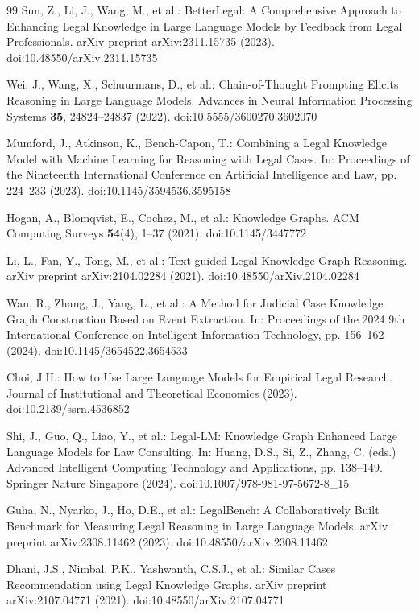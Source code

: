 \documentclass{article}
\theoremstyle{plain}
\theoremstyle{definition}
\begin{document}
\begin{thebibliography}{99}
Sun, Z., Li, J., Wang, M., et al.: BetterLegal: A Comprehensive Approach to Enhancing Legal Knowledge in Large Language Models by Feedback from Legal Professionals. arXiv preprint arXiv:2311.15735 (2023). doi:10.48550/arXiv.2311.15735

Wei, J., Wang, X., Schuurmans, D., et al.: Chain-of-Thought Prompting Elicits Reasoning in Large Language Models. Advances in Neural Information Processing Systems \textbf{35}, 24824--24837 (2022). doi:10.5555/3600270.3602070

Mumford, J., Atkinson, K., Bench-Capon, T.: Combining a Legal Knowledge Model with Machine Learning for Reasoning with Legal Cases. In: Proceedings of the Nineteenth International Conference on Artificial Intelligence and Law, pp. 224--233 (2023). doi:10.1145/3594536.3595158

Hogan, A., Blomqvist, E., Cochez, M., et al.: Knowledge Graphs. ACM Computing Surveys \textbf{54}(4), 1--37 (2021). doi:10.1145/3447772

Li, L., Fan, Y., Tong, M., et al.: Text-guided Legal Knowledge Graph Reasoning. arXiv preprint arXiv:2104.02284 (2021). doi:10.48550/arXiv.2104.02284

Wan, R., Zhang, J., Yang, L., et al.: A Method for Judicial Case Knowledge Graph Construction Based on Event Extraction. In: Proceedings of the 2024 9th International Conference on Intelligent Information Technology, pp. 156--162 (2024). doi:10.1145/3654522.3654533

Choi, J.H.: How to Use Large Language Models for Empirical Legal Research. Journal of Institutional and Theoretical Economics (2023). doi:10.2139/ssrn.4536852

Shi, J., Guo, Q., Liao, Y., et al.: Legal-LM: Knowledge Graph Enhanced Large Language Models for Law Consulting. In: Huang, D.S., Si, Z., Zhang, C. (eds.) Advanced Intelligent Computing Technology and Applications, pp. 138--149. Springer Nature Singapore (2024). doi:10.1007/978-981-97-5672-8\_15

Guha, N., Nyarko, J., Ho, D.E., et al.: LegalBench: A Collaboratively Built Benchmark for Measuring Legal Reasoning in Large Language Models. arXiv preprint arXiv:2308.11462 (2023). doi:10.48550/arXiv.2308.11462

Dhani, J.S., Nimbal, P.K., Yashwanth, C.S.J., et al.: Similar Cases Recommendation using Legal Knowledge Graphs. arXiv preprint arXiv:2107.04771 (2021). doi:10.48550/arXiv.2107.04771


\end{thebibliography}
\end{document}
